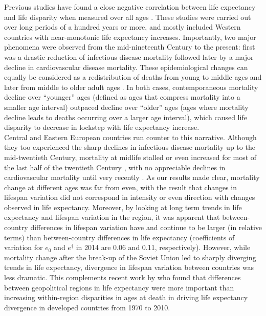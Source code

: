 \documentclass{article}
\begin{document}
\begin{spacing}{1.5}
Previous studies have found a close negative correlation between life expectancy and life disparity when measured over all ages  \citep{ wilmoth1999,vaupel2011,colchero2016emergence}. These studies were carried out over long periods of a hundred years or more, and mostly included Western countries with near-monotonic life expectancy increases. Importantly, two major phenomena were observed from the mid-nineteenth Century to the present: first was a drastic reduction of infectious disease mortality followed later by a major decline in cardiovascular disease mortality. These epidemiological changes can equally be considered as a redistribution of deaths from young to middle ages and later from middle to older adult ages \citep{robine2001redefining}. In both cases, contemporaneous mortality decline over ``younger'' ages (defined as ages that compress mortality into a smaller age interval) outpaced decline over ``older'' ages (ages where mortality decline leads to deaths occurring over a larger age interval), which caused life disparity to decrease in lockstep with life expectancy increase.\\

Central and Eastern European countries run counter to this narrative. Although they too experienced the sharp declines in infectious disease mortality up to the mid-twentieth Century, mortality at midlife stalled or even increased for most of the last half of the twentieth Century \citep{mckee2001}, with no appreciable declines in cardiovascular mortality until very recently \citep{caselli2002epidemiologic, grigoriev2014recent,mesle2004mortality}.  As our results made clear, mortality change at different ages was far from even, with the result that changes in lifespan variation did not correspond in intensity or even direction with changes observed in life expectancy.
Moreover, by looking at long term trends in life expectancy and lifespan variation in the region, it was apparent that between-country differences in lifespan variation have and continue to be larger (in relative terms) than between-country differences in life expectancy (coefficients of variation for $e_0$ and $e^\dagger$ in 2014 are 0.06 and 0.11, respectively). However, while mortality change after the break-up of the Soviet Union led to sharply diverging trends in life expectancy, divergence in lifespan variation between countries was less dramatic. This complements recent work by \citet{timonin2016disparities} who found that differences between geopolitical regions in life expectancy were more important than increasing within-region disparities in ages at death in driving life expectancy divergence in developed countries from 1970 to 2010.\\


\end{spacing}
\end{document}
